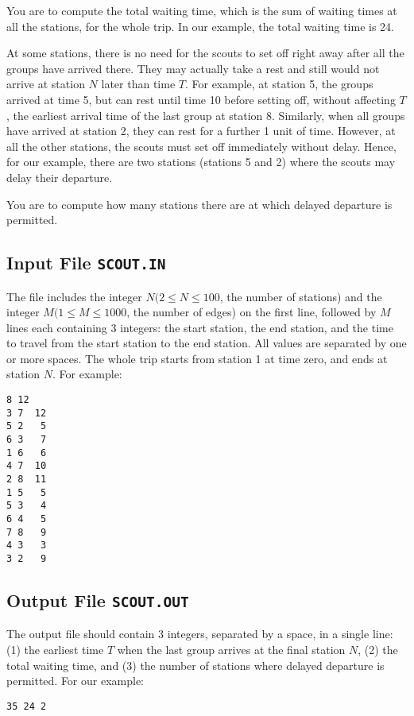 You are to compute the total waiting time,
which is the sum of waiting times at all the stations,
for the whole trip.
In our example,
the total waiting time is  24.

At some stations, there is no need for the scouts to set off right away
after all the groups have arrived there.
They may actually take a rest and still
would not arrive at station $N$ later than time $T$.
For example, at station 5, the groups arrived at time 5, but can rest
until time 10 before setting off, without affecting $T$,
the earliest arrival time of the last group at station 8.
Similarly, when all groups have arrived at station 2,
they can rest for a further 1 unit of time.  However, at all the other
stations, the scouts must set off immediately without delay.
Hence, for our example, there are two stations (stations 5 and 2) where
the scouts may delay their departure.  

You are to compute how many stations there are at which delayed departure
is permitted.

\subsection{Input File {\tt SCOUT.IN}}

The file includes the integer $N (2\leq N\leq 100$, the number of stations)
and the integer $M (1\leq M\leq 1000$, the number of edges)
on the first line,
followed by
$M$
lines each containing 3 integers: the start station, the end station,
and the time to travel from the start station to the end station.  All
values are separated by one or more spaces.  The whole trip starts from
station 1 at time zero, and ends at station $N$.
For example:
\begin{verbatim}
8 12
3 7  12
5 2   5
6 3   7
1 6   6
4 7  10
2 8  11
1 5   5
5 3   4
6 4   5
7 8   9
4 3   3
3 2   9
\end{verbatim}

\subsection{Output File {\tt SCOUT.OUT}}

The output file should contain 3 integers,
separated by a space,
in a single line:
(1) the earliest time $T$ when the last group arrives at the final station $N$,
(2) the total waiting time,
and (3)
the number of stations where delayed departure is permitted.
For our example:

\begin{verbatim}
35 24 2
\end{verbatim}

